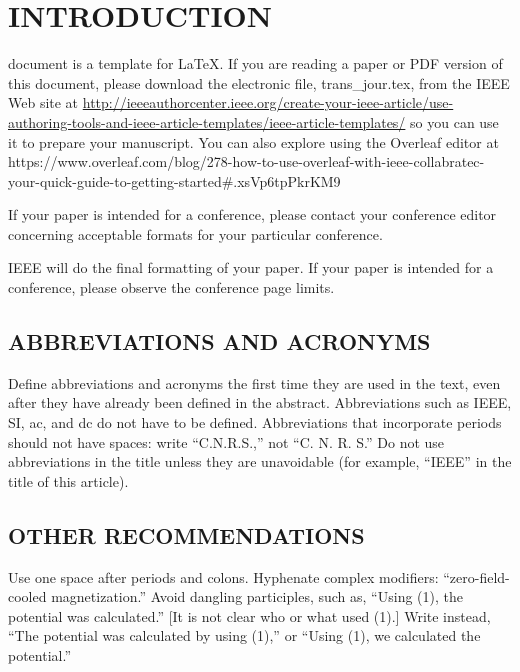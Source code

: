 \documentclass{IEEEoj}
\begin{document}

\maketitle

\section{INTRODUCTION}
 document is a template for \LaTeX. If you are 
reading a paper or PDF version of this document, please download the 
electronic file, trans\_jour.tex, from the IEEE Web site at \underline
{http://ieeeauthorcenter.ieee.org/create-your-ieee-article/}\break\underline{use-authoring-tools-and-ieee-article-templates/ieee-article-}\break\underline{templates/} so you can use it to prepare your manuscript.
You can also explore using the Overleaf editor at 
{https://www.overleaf.com/blog/278-how-to-use-overleaf-with-ieee-collabratec-your-quick-guide-to-getting-started\break\#.xsVp6tpPkrKM9}

If your paper is intended for a conference, please contact your conference 
editor concerning acceptable formats for your particular 
conference.

IEEE will do the final formatting of your paper. If your paper is intended 
for a conference, please observe the conference page limits.

\subsection{ABBREVIATIONS AND ACRONYMS}
Define abbreviations and acronyms the first time they are used in the text, 
even after they have already been defined in the abstract. Abbreviations 
such as IEEE, SI, ac, and dc do not have to be defined. Abbreviations that 
incorporate periods should not have spaces: write ``C.N.R.S.,'' not ``C. N. 
R. S.'' Do not use abbreviations in the title unless they are unavoidable 
(for example, ``IEEE'' in the title of this article).

\subsection{OTHER RECOMMENDATIONS}
Use one space after periods and colons. Hyphenate complex modifiers: 
``zero-field-cooled magnetization.'' Avoid dangling participles, such as, 
``Using (1), the potential was calculated.'' [It is not clear who or what 
used (1).] Write instead, ``The potential was calculated by using (1),'' or 
``Using (1), we calculated the potential.''
\end{document}
